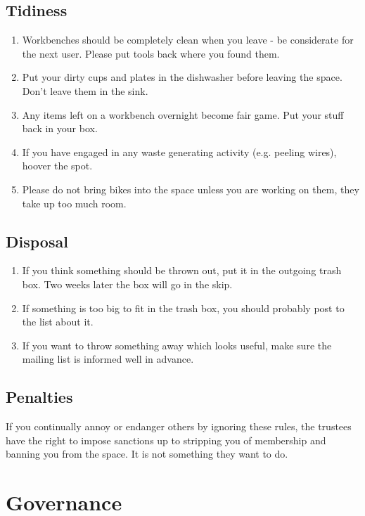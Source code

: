 \documentclass[12pt,a4paper]{book}
\begin{document}
\subsection{Tidiness}

\begin{enumerate}
	\item Workbenches should be completely clean when you leave - be considerate for the next user. Please put tools back where you found them.
	\item Put your dirty cups and plates in the dishwasher before leaving the space. Don't leave them in the sink.
	\item Any items left on a workbench overnight become fair game. Put your stuff back in your box.
	\item If you have engaged in any waste generating activity (e.g. peeling wires), hoover the spot.
	\item Please do not bring bikes into the space unless you are working on them, they take up too much room.
\end{enumerate}

\subsection{Disposal}

\begin{enumerate}
	\item If you think something should be thrown out, put it in the outgoing trash box. Two weeks later the box will go in the skip.
	\item If something is too big to fit in the trash box, you should probably post to the list about it.
	\item If you want to throw something away which looks useful, make sure the mailing list is informed well in advance.
\end{enumerate}

\subsection{Penalties}

If you continually annoy or endanger others by ignoring these rules, the trustees have the right to impose sanctions up to stripping you of membership and banning you from the space. It is not something they want to do.

\section{Governance}
\end{document}
